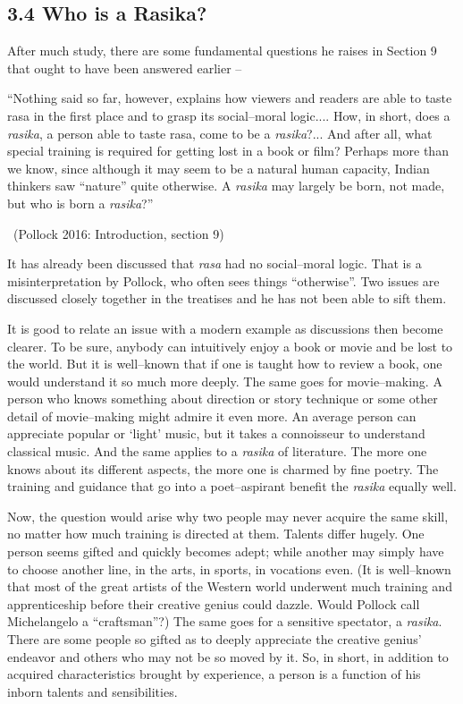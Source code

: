 \subsection*{3.4 Who is a Rasika?}

After much study, there are some fundamental questions he raises in Section 9 that ought to have been answered earlier –

\begin{myquote}
“Nothing said so far, however, explains how viewers and readers are able to taste rasa in the first place and to grasp its social–moral logic.... How, in short, does a \textit{rasika}, a person able to taste rasa, come to be a \textit{rasika}?... And after all, what special training is required for getting lost in a book or film? Perhaps more than we know, since although it may seem to be a natural human capacity, Indian thinkers saw “nature” quite otherwise. A \textit{rasika} may largely be born, not made, but who is born a \textit{rasika}?” 

~\hfill (Pollock 2016: Introduction, section 9)
\end{myquote}

It has already been discussed that \textit{rasa }had no social–moral logic. That is a misinterpretation by Pollock, who often sees things “otherwise”. Two issues are discussed closely together in the treatises and he has not been able to sift them.

It is good to relate an issue with a modern example as discussions then become clearer. To be sure, anybody can intuitively enjoy a book or movie and be lost to the world. But it is well–known that if one is taught how to review a book, one would understand it so much more deeply. The same goes for movie–making. A person who knows something about direction or story technique or some other detail of movie–making might admire it even more. An average person can appreciate popular or ‘light’ music, but it takes a connoisseur to understand classical music. And the same applies to a \textit{rasika }of literature. The more one knows about its different aspects, the more one is charmed by fine poetry. The training and guidance that go into a poet–aspirant benefit the \textit{rasika} equally well.

Now, the question would arise why two people may never acquire the same skill, no matter how much training is directed at them. Talents differ hugely. One person seems gifted and quickly becomes adept; while another may simply have to choose another line, in the arts, in sports, in vocations even. (It is well–known that most of the great artists of the Western world underwent much training and apprenticeship before their creative genius could dazzle. Would Pollock call Michelangelo a “craftsman”?) The same goes for a sensitive spectator, a \textit{rasika}. There are some people so gifted as to deeply appreciate the creative genius’ endeavor and others who may not be so moved by it. So, in short, in addition to acquired characteristics brought by experience, a person is a function of his inborn talents and sensibilities.


